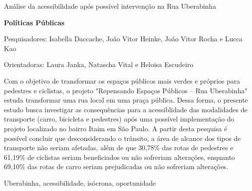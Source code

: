 
    

\relatorio
{Análise da acessibilidade após possível intervenção na Rua Uberabinha}
{

    \noindent \textbf{Políticas Públicas}
    
    \noindent Pesquisadores: Isabella Daccache, João Vitor Heinke, João Vitor Rocha e Lucca Kao
    
    \noindent Orientadoras: Laura Janka, Natascha Vital e Heloisa Escudeiro

}
{

   Com o objetivo de transformar os espaços públicos mais verdes e próprios para pedestres e ciclistas, o projeto "Repensando Espaços Públicos – Rua Uberabinha" estuda transformar uma rua local em uma praça pública. Dessa forma, o presente estudo busca investigar as consequências para a acessiblidade das modalidades de transporte (carro, bicicleta e pedestres) após uma possível implementação do projeto localizado no bairro Itaim em São Paulo. A partir desta pesquisa é possível concluir que desconsiderando o trânsito, a área de alcance dos tipos de transporte não seriam afetadas, além de que 30,78\% das rotas de pedestres e 61,19\% de ciclistas seriam beneficiados ou não sofreriam alterações, enquanto 69,10\% das rotas de carro seriam prejudicadas ou não sofreriam alterações.
}
{
Uberabinha, acessibilidade, isócrona, oportunidade
}


